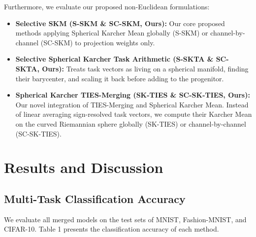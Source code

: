 \documentclass{article}
\begin{document}
Furthermore, we evaluate our proposed non-Euclidean formulations:
\begin{itemize}
  \item \textbf{Selective SKM (S-SKM \& SC-SKM, Ours):} Our core proposed methods applying Spherical Karcher Mean globally (S-SKM) or channel-by-channel (SC-SKM) to projection weights only.
  \item \textbf{Selective Spherical Karcher Task Arithmetic (S-SKTA \& SC-SKTA, Ours):} Treats task vectors as living on a spherical manifold, finding their barycenter, and scaling it back before adding to the progenitor.
  \item \textbf{Spherical Karcher TIES-Merging (SK-TIES \& SC-SK-TIES, Ours):} Our novel integration of TIES-Merging and Spherical Karcher Mean. Instead of linear averaging sign-resolved task vectors, we compute their Karcher Mean on the curved Riemannian sphere globally (SK-TIES) or channel-by-channel (SC-SK-TIES).
\end{itemize}

\section{Results and Discussion}
\subsection{Multi-Task Classification Accuracy}
We evaluate all merged models on the test sets of MNIST, Fashion-MNIST, and CIFAR-10. Table 1 presents the classification accuracy of each method.
\end{document}
